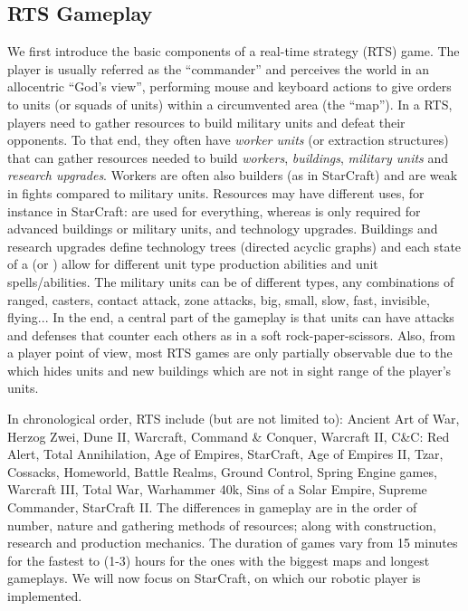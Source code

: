 \subsection{RTS Gameplay}
\label{sec:rtsgameplay}
We first introduce the basic components of a real-time strategy (RTS) game. The player is usually referred as the ``commander'' and perceives the world in an allocentric ``God's view'', performing mouse and keyboard actions to give orders to units (or squads of units) within a circumvented area (the ``map''). In a RTS, players need to gather resources to build military units and defeat their opponents. To that end, they often have \textit{worker units} (or extraction structures) that can gather resources needed to build \textit{workers}, \textit{buildings}, \textit{military units} and \textit{research upgrades}. Workers are often also builders (as in StarCraft) and are weak in fights compared to military units. Resources may have different uses, for instance in StarCraft:  are used for everything, whereas  is only required for advanced buildings or military units, and technology upgrades. Buildings and research upgrades define technology trees (directed acyclic graphs) and each state of a 
 (or ) allow for different unit type production abilities and unit spells/abilities. The military units can be of different types, any combinations of ranged, casters, contact attack, zone attacks, big, small, slow, fast, invisible, flying... In the end, a central part of the gameplay is that units can have attacks and defenses that counter each others as in a soft rock-paper-scissors. Also, from a player point of view, most RTS games are only partially observable due to the \textit{} which hides units and new buildings which are not in sight range of the player's units. 


In chronological order, RTS include (but are not limited to): Ancient Art of War, Herzog Zwei, Dune II, Warcraft, Command \& Conquer, Warcraft II, C\&C: Red Alert, Total Annihilation, Age of Empires, StarCraft, Age of Empires II, Tzar, Cossacks, Homeworld, Battle Realms, Ground Control, Spring Engine games, Warcraft III, Total War, Warhammer 40k, Sins of a Solar Empire, Supreme Commander, StarCraft II. The differences in gameplay are in the order of number, nature and gathering methods of resources; along with construction, research and production mechanics. The duration of games vary from 15 minutes for the fastest to (1-3) hours for the ones with the biggest maps and longest gameplays. We will now focus on StarCraft, on which our robotic player is implemented.



